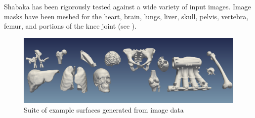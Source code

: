 Shabaka has been rigorously tested against a wide variety of input images. Image masks have been meshed for the heart, brain, lungs, liver, skull, pelvis, vertebra, femur, and portions of the knee joint (see ).

\begin{figure}[ht!]
\centering
\vspace{2.5mm}
\includegraphics[width=1.0\textwidth]{media/2-shabaka/2-surf/6-showcase.png}
\caption{Suite of example surfaces generated from image data}
\label{fig:showcase}
\end{figure}
